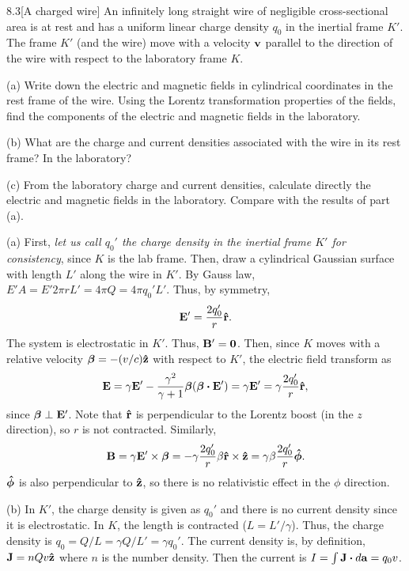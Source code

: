 \documentclass[12pt]{article}
\begin{document}
\begin{problem}{8.3}[A charged wire]
An infinitely long straight wire of negligible cross-sectional area is at rest
and has a uniform linear charge density $q_0$ in the inertial frame $K'$. The
frame $K'$ (and the wire) move with a velocity $\vb{v}$ parallel to the
direction of the wire with respect to the laboratory frame $K$.

(a) Write down the electric and magnetic fields in cylindrical coordinates in
the rest frame of the wire. Using the Lorentz transformation properties of the
fields, find the components of the electric and magnetic fields in the
laboratory.

(b) What are the charge and current densities associated with the wire in its
rest frame? In the laboratory?

(c) From the laboratory charge and current densities, calculate directly the
electric and magnetic fields in the laboratory. Compare with the results of part
(a).
\begin{solution}
(a) First, \textit{let us call $q_0'$ the charge density in the inertial frame
$K'$ for consistency}, since $K$ is the lab frame. Then, draw a cylindrical 
Gaussian surface with length $L'$ along the wire in $K'$. By Gauss law, 
$E'A=E'2\pi rL'=4\pi Q=4\pi q_0'L'$. Thus, by symmetry,
\begin{equation}\label{p3a:E}
    \vb{E}'=\frac{2q_0'}{r}\vb{\hat{r}}.
\end{equation}
The system is electrostatic in $K'$. Thus, $\vb{B}'=\bm0$. Then, since $K$ moves
with a relative velocity $\bm\beta=-(v/c)\vb{\hat{z}}$ with respect to $K'$, the
electric field transform as
\begin{equation}
    \vb{E}=\gamma\vb{E}'-\frac{\gamma^2}{\gamma+1}\bm\beta(\bm\beta\vdot\vb{E}') 
    =\gamma\vb{E}'=\gamma\frac{2q_0'}{r}\rhat,
\end{equation}
since $\bm\beta\perp\vb{E}'$. Note that $\vb{\hat{r}}$ is perpendicular to
the Lorentz boost (in the $z$ direction), so $r$ is not contracted. Similarly,
\begin{equation}
    \vb{B}=\gamma\vb{E}' \times\bm\beta
    =-\gamma\frac{2q_0'}{r}\beta\vb{\hat{r}}\times\vb{\hat{z}}
    =\gamma\beta\frac{2q_0'}{r}\bm{\hat{\phi}}.
\end{equation}
$\bm{\hat{\phi}}$ is also perpendicular to $\vb{\hat{z}}$, so there is no relativistic effect
in the $\phi$ direction.

(b) In $K'$, the charge density is given as $q_0'$ and there is no current
density since it is electrostatic. In $K$, the length is contracted
($L=L'/\gamma$). Thus, the charge density is $q_0=Q/L=\gamma Q/L'=\gamma q_0'$.
The current density is, by definition, $\vb{J}=nQv\vb{\hat{z}}$ where $n$ is the
number density. Then the current is $I=\int\vb{J}\vdot d\vb{a}=q_0v$.


\end{solution}
\end{problem}
\end{document}
